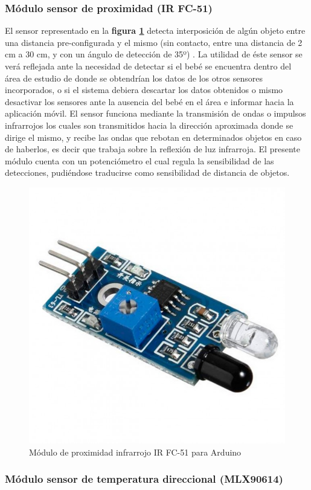 \documentclass{IEEEtran}
\begin{document}
			\subsubsection{Módulo sensor de proximidad (\textbf{IR FC-51})}

				El sensor representado en la \textbf{figura \ref{arduino-modulo-proximidad}} detecta interposición de algún objeto entre una distancia pre-configurada y el mismo (sin contacto, entre una distancia de 2 cm a 30 cm, y con un ángulo de detección de 35º) \cite{proximidadtecnico}. La utilidad de éste sensor se verá reflejada ante la necesidad de detectar si el bebé se encuentra dentro del área de estudio de donde se obtendrían los datos de los otros sensores incorporados, o si el sistema debiera descartar los datos obtenidos o mismo desactivar los sensores ante la ausencia del bebé en el área e informar hacia la aplicación móvil. El sensor funciona mediante la transmisión de ondas o impulsos infrarrojos los cuales son transmitidos hacia la dirección aproximada donde se dirige el mismo, y recibe las ondas que rebotan en determinados objetos en caso de haberlos, es decir que trabaja sobre la reflexión de luz infrarroja. El presente módulo cuenta con un potenciómetro el cual regula la sensibilidad de las detecciones, pudiéndose traducirse como sensibilidad de distancia de objetos. 

				\begin{figure}
					\centering
					\includegraphics[width=0.5\linewidth]{arduino-modulo-proximidad}
					\caption{Módulo de proximidad infrarrojo IR FC-51 para Arduino}
					\label{arduino-modulo-proximidad}
				\end{figure}

			\subsubsection{Módulo sensor de temperatura direccional (\textbf{MLX90614})}
			
\end{document}
